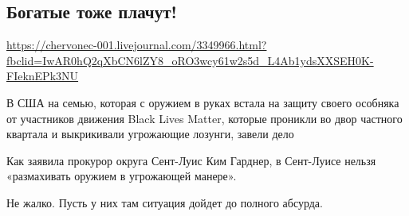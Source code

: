 
 
\subsection{Богатые тоже плачут!}
\label{sec:21_07_2020.lj.chervonec_001.1}
\url{https://chervonec-001.livejournal.com/3349966.html?fbclid=IwAR0hQ2qXbCN6lZY8_oRO3wcy61w2s5d_L4Ab1ydsXXSEH0K-FIeknEPk3NU}

В США на семью, которая с оружием в руках встала на защиту своего особняка от
участников движения Black Lives Matter, которые проникли во двор частного
квартала и выкрикивали угрожающие лозунги, завели дело

Как заявила прокурор округа Сент-Луис Ким Гарднер, в Сент-Луисе нельзя
«размахивать оружием в угрожающей манере».

Не жалко. Пусть у них там ситуация дойдет до полного абсурда.

  
